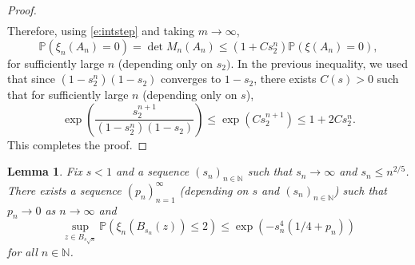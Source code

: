 \documentclass{amsart}
\theoremstyle{plain}
\newtheorem{lemma}[theorem]{Lemma}
\theoremstyle{definition}
\theoremstyle{remark}
\def\P{\mathbb P}
\begin{document}
\begin{proof}
\begin{align*}
	\end{align*}
	Therefore, using \eqref{e:intstep} and taking $m\rightarrow \infty$,
	$$
	\mathbb P(\xi_n(A_n)=0)=\det M_{n}(A_n) \le (1+C s_2^{n}) \mathbb P(\xi(A_n)=0),
	$$
for sufficiently large $n$ (depending only on $s_2)$. 
In the previous inequality, we used that since $(1-s_2^n) (1-s_2)$ converges to $1-s_2$, there exists $C(s)>0$ such that for sufficiently large $n$ (depending only on $s$),
\[
\exp\left(\frac{s_2^{n+1}}{(1-s_2^n)(1-s_2)}  \right)\le \exp( C s_2^{n+1} ) \le 1 + 2C s_2^{n}.
\]
This completes the proof.
\end{proof}

\begin{lemma}\label{lem:mom2}
Fix  $s<1$ and a sequence $(s_n)_{n \in \mathbb N}$ such that $s_n \to \infty$ and $s_n \le n^{2/5}$. There exists a sequence $(p_n)_{n=1}^\infty$ (depending on $s$ and  $(s_n)_{n \in \mathbb N}$) such that $p_n \to 0$ as $n \to \infty$ and 
\[
\sup_{z \in B_{s \sqrt{n}} } \P ( \xi_n ( B_{s_n} (z)) \le 2 ) \le \exp(-s_n^4(1/4+p_n))
\]
for all $n \in \mathbb{N}$.
\end{lemma}
\end{document}
